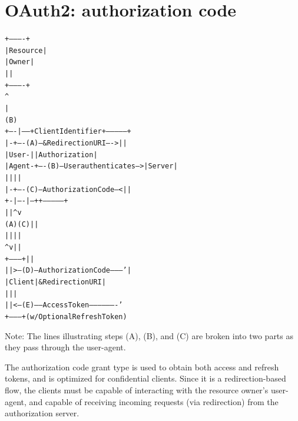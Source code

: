 \documentclass[11pt]{style}
\begin{document}
\section{OAuth2: authorization code}
\begin{alltt}
     +----------+
     | Resource |
     |   Owner  |
     |          |
     +----------+
          ^
          |
         (B)
     +----|-----+          Client Identifier      +---------------+
     |         -+----(A)-- & Redirection URI ---->|               |
     |  User-   |                                 | Authorization |
     |  Agent  -+----(B)-- User authenticates --->|     Server    |
     |          |                                 |               |
     |         -+----(C)-- Authorization Code ---<|               |
     +-|----|---+                                 +---------------+
       |    |                                         ^      v
      (A)  (C)                                        |      |
       |    |                                         |      |
       ^    v                                         |      |
     +---------+                                      |      |
     |         |>---(D)-- Authorization Code ---------'      |
     |  Client |          & Redirection URI                  |
     |         |                                             |
     |         |<---(E)----- Access Token -------------------'
     +---------+       (w/ Optional Refresh Token)

 \end{alltt}
Note: The lines illustrating steps (A), (B), and (C) are broken into
two parts as they pass through the user-agent.


The authorization code grant type is used to obtain both access and refresh
tokens, and is optimized for confidential clients.
Since it is a redirection-based flow, the clients must be capable of interacting
with the resource owner's user-agent, and capable of receiving incoming requests
(via redirection) from the authorization server.
\end{document}
